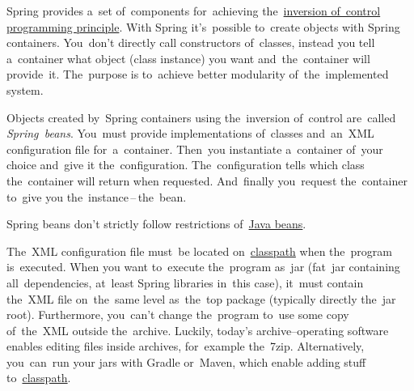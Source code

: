 \label{springinversionofcontrol}
Spring provides a~set of~components for~achieving the~\hyperref[inversionofcontrol]{inversion of~control programming principle}. With Spring it's~possible to~create objects with Spring containers. You~don't directly call constructors of~classes, instead you tell a~container what object (class instance) you want and~the~container will provide~it. The~purpose is to~achieve better modularity of~the~implemented system.

Objects created by~Spring containers using the~inversion of~control are~called \textit{Spring~beans}. You~must provide implementations of~classes and~an~XML configuration file for~a~container. Then~you instantiate a~container of~your choice and~give it the~configuration. The~configuration tells which class the~container will return when requested. And~finally you~request the~container to~give you the~instance\,--\,the~bean.

\warning Spring beans don't strictly follow restrictions of~\hyperref[javabeans]{Java beans}.

\warning The~XML configuration file must~be located on~\hyperref[classpath]{classpath} when the~program is~executed. When you want to~execute the~program as~jar (fat~jar containing all~dependencies, at~least Spring libraries in~this case), it~must contain the~XML file on~the~same level as~the~top package (typically directly the~jar root). Furthermore, you~can't change the~program to~use some copy of~the~XML outside the~archive. Luckily, today's archive--operating software enables editing files inside archives, for~example the~7zip. Alternatively, you~can~run your jars with Gradle or~Maven, which enable adding stuff to~\hyperref[classpath]{classpath}.
\newpage

